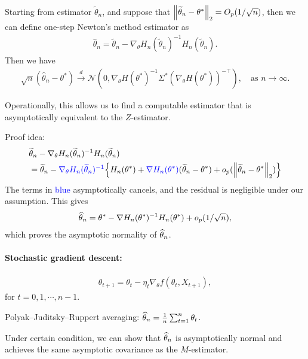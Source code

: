 \documentclass[11pt,letterpaper]{article}
\numberwithin{assumption}{lecture}
\numberwithin{theorem}{lecture}
\numberwithin{proposition}{lecture}
\numberwithin{lemma}{lecture}
\numberwithin{claim}{lecture}
\numberwithin{corollary}{lecture}
\numberwithin{definition}{lecture}
\numberwithin{conjecture}{lecture}
\numberwithin{remark}{lecture}
\numberwithin{example}{lecture}
\numberwithin{equation}{lecture}
\begin{document}
\begin{theorem}
  Starting from estimator $\widetilde{\theta}_n$, and suppose that $\left\| \widetilde{\theta}_n - \theta^*\right\|_{2} = O_p (1/\sqrt{n})$, then we can define one-step Newton's method estimator as
  \begin{align*}
    \widehat{\theta}_n = \widetilde{\theta}_n - \nabla_\theta H_n (\widetilde{\theta}_n)^{-1} H_n (\widetilde{\theta}_n).
  \end{align*}
  Then we have
  \begin{align*}
    \sqrt{n} (\widehat{\theta}_n - \theta^*) \xrightarrow{d} \mathcal{N} (0, \nabla_\theta H (\theta^*)^{-1} \Sigma^* (\nabla_\theta H (\theta^*))^{- \top}), \quad \text{as } n \to \infty.
  \end{align*}
\end{theorem}
Operationally, this allows us to find a computable estimator that is asymptotically equivalent to the $Z$-estimator.

Proof idea:
\begin{align*}
   &\widetilde{\theta}_n - \nabla_\theta H_n (\widetilde{\theta}_n)^{-1} H_n (\widetilde{\theta}_n)\\
   &= \widetilde{\theta}_n - {\color{blue}\nabla_\theta H_n (\widetilde{\theta}_n)^{-1}} \Big\{ H_n (\theta^*) + {\color{blue}\nabla H_n (\theta^*)} (\widetilde{\theta}_n - \theta^*) + o_p (\left\| \widetilde{\theta}_n - \theta^*\right\|_{2}) \Big\}
\end{align*}
The terms in {\textcolor{blue}{blue}} asymptotically cancels, and the residual is negligible under our assumption. This gives
\begin{align*}
  \widehat{\theta}_n = \theta^* - \nabla H_n (\theta^*)^{-1} H_n (\theta^*) + o_p (1/\sqrt{n}),
\end{align*}
which proves the asymptotic normality of $\widehat{\theta}_n$.

\paragraph{Stochastic gradient descent:}
\begin{align*}
  \theta_{t + 1} = \theta_t - \eta_t \nabla_\theta f(\theta_t, X_{t + 1}),
\end{align*}
for $t = 0,1, \cdots, n - 1$.

Polyak--Juditsky--Ruppert averaging: $\widehat{\theta}_n = \frac{1}{n} \sum_{t=1}^n \theta_t$.

Under certain condition, we can show that $\widehat{\theta}_n$ is asymptotically normal and achieves the same asymptotic covariance as the $M$-estimator.
\end{document}
